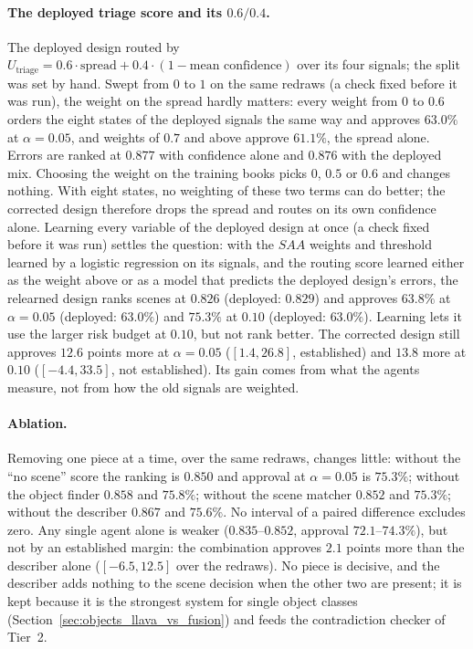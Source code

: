 \paragraph{The deployed triage score and its $0.6/0.4$.} The deployed design routed by $U_{\text{triage}} = 0.6 \cdot \text{spread} + 0.4 \cdot (1 - \text{mean confidence})$ over its four signals; the split was set by hand. Swept from $0$ to $1$ on the same redraws (a check fixed before it was run), the weight on the spread hardly matters: every weight from $0$ to $0.6$ orders the eight states of the deployed signals the same way and approves $63.0\%$ at $\alpha=0.05$, and weights of $0.7$ and above approve $61.1\%$, the spread alone. Errors are ranked at $0.877$ with confidence alone and $0.876$ with the deployed mix. Choosing the weight on the training books picks $0$, $0.5$ or $0.6$ and changes nothing. With eight states, no weighting of these two terms can do better; the corrected design therefore drops the spread and routes on its own confidence alone. Learning every variable of the deployed design at once (a check fixed before it was run) settles the question: with the $SAA$ weights and threshold learned by a logistic regression on its signals, and the routing score learned either as the weight above or as a model that predicts the deployed design's errors, the relearned design ranks scenes at $0.826$ (deployed: $0.829$) and approves $63.8\%$ at $\alpha=0.05$ (deployed: $63.0\%$) and $75.3\%$ at $0.10$ (deployed: $63.0\%$). Learning lets it use the larger risk budget at $0.10$, but not rank better. The corrected design still approves $12.6$ points more at $\alpha=0.05$ ($[1.4, 26.8]$, established) and $13.8$ more at $0.10$ ($[-4.4, 33.5]$, not established). Its gain comes from what the agents measure, not from how the old signals are weighted.

\paragraph{Ablation.} Removing one piece at a time, over the same redraws, changes little: without the ``no scene'' score the ranking is $0.850$ and approval at $\alpha=0.05$ is $75.3\%$; without the object finder $0.858$ and $75.8\%$; without the scene matcher $0.852$ and $75.3\%$; without the describer $0.867$ and $75.6\%$. No interval of a paired difference excludes zero. Any single agent alone is weaker ($0.835$--$0.852$, approval $72.1$--$74.3\%$), but not by an established margin: the combination approves $2.1$ points more than the describer alone ($[-6.5, 12.5]$ over the redraws). No piece is decisive, and the describer adds nothing to the scene decision when the other two are present; it is kept because it is the strongest system for single object classes (Section~\ref{sec:objects_llava_vs_fusion}) and feeds the contradiction checker of Tier~2.

